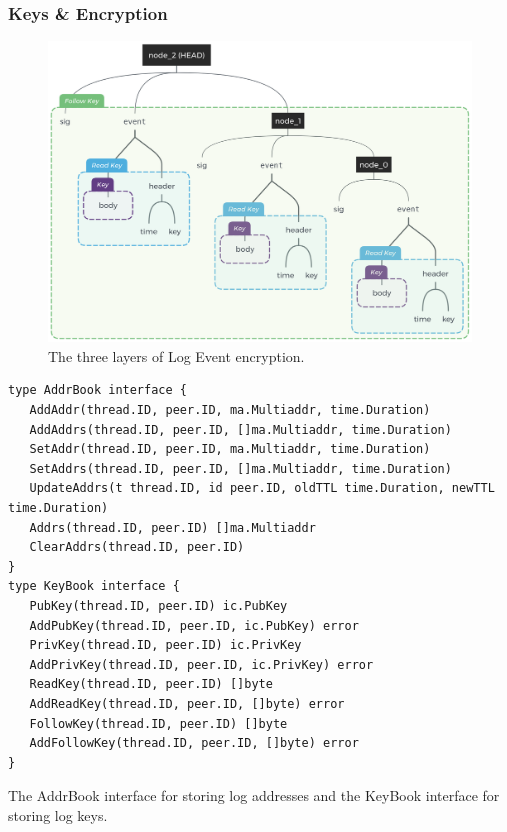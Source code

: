 \documentclass{textile}
\begin{document}
\subsubsection{Keys \& Encryption} \label{sec:KeysEncryption}

\begin{figure}[!t]
\centering
\begin{minipage}{0.6\textwidth}
  \includegraphics[width=\linewidth]{figures/Event_Log_With_Encryption.png}
  \caption{The three layers of Log Event encryption.}
  \label{fig:LogEncryption}
  \end{minipage}
\end{figure}

\begin{example}[!b]
\begin{lstlisting}
type AddrBook interface {
   AddAddr(thread.ID, peer.ID, ma.Multiaddr, time.Duration)
   AddAddrs(thread.ID, peer.ID, []ma.Multiaddr, time.Duration)
   SetAddr(thread.ID, peer.ID, ma.Multiaddr, time.Duration)
   SetAddrs(thread.ID, peer.ID, []ma.Multiaddr, time.Duration)
   UpdateAddrs(t thread.ID, id peer.ID, oldTTL time.Duration, newTTL time.Duration)
   Addrs(thread.ID, peer.ID) []ma.Multiaddr
   ClearAddrs(thread.ID, peer.ID)
}
type KeyBook interface {
   PubKey(thread.ID, peer.ID) ic.PubKey
   AddPubKey(thread.ID, peer.ID, ic.PubKey) error
   PrivKey(thread.ID, peer.ID) ic.PrivKey
   AddPrivKey(thread.ID, peer.ID, ic.PrivKey) error
   ReadKey(thread.ID, peer.ID) []byte
   AddReadKey(thread.ID, peer.ID, []byte) error
   FollowKey(thread.ID, peer.ID) []byte
   AddFollowKey(thread.ID, peer.ID, []byte) error
}
\end{lstlisting}
\caption{The AddrBook interface for storing log addresses and the KeyBook interface for storing log keys.}
\label{ex:KeyBook}
\end{example} 
\end{document}
